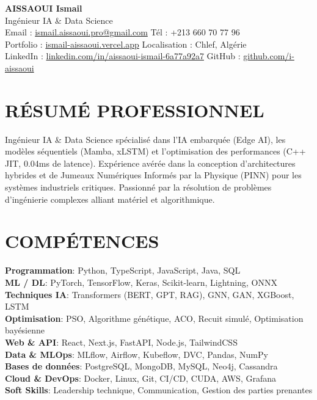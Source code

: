 \documentclass[a4paper,12pt]{article}
\begin{document}
\begin{center}
    {\Huge\bfseries\color{titleblue} AISSAOUI Ismail}\\[4pt]
    {\Large Ingénieur IA \& Data Science}\\[6pt]

    {\normalsize
    Email : \href{mailto:ismail.aissaoui.pro@gmail.com}{ismail.aissaoui.pro@gmail.com} \quad
    Tél : +213 660 70 77 96 \\
    Portfolio : \href{https://ismail-aissaoui.vercel.app}{ismail-aissaoui.vercel.app} \quad
    Localisation : Chlef, Algérie \\
    LinkedIn : \href{https://linkedin.com/in/aissaoui-ismail-6a77a92a7}{linkedin.com/in/aissaoui-ismail-6a77a92a7} \quad
    GitHub : \href{https://github.com/i-aissaoui}{github.com/i-aissaoui}
    }
\end{center}

\section{RÉSUMÉ PROFESSIONNEL}
Ingénieur IA \& Data Science spécialisé dans l'IA embarquée (Edge AI), les modèles séquentiels (Mamba, xLSTM) et l'optimisation des performances (C++ JIT, 0.04ms de latence). Expérience avérée dans la conception d'architectures hybrides et de Jumeaux Numériques Informés par la Physique (PINN) pour les systèmes industriels critiques. Passionné par la résolution de problèmes d'ingénierie complexes alliant matériel et algorithmique.

\section{COMPÉTENCES}
\setlength{\parskip}{-1pt}
{\normalsize
\textbf{Programmation}: Python, TypeScript, JavaScript, Java, SQL \\
\textbf{ML / DL}: PyTorch, TensorFlow, Keras, Scikit-learn, Lightning, ONNX \\
\textbf{Techniques IA}: Transformers (BERT, GPT, RAG), GNN, GAN, XGBoost, LSTM \\
\textbf{Optimisation}: PSO, Algorithme génétique, ACO, Recuit simulé, Optimisation bayésienne \\
\textbf{Web \& API}: React, Next.js, FastAPI, Node.js, TailwindCSS \\
\textbf{Data \& MLOps}: MLflow, Airflow, Kubeflow, DVC, Pandas, NumPy \\
\textbf{Bases de données}: PostgreSQL, MongoDB, MySQL, Neo4j, Cassandra \\
\textbf{Cloud \& DevOps}: Docker, Linux, Git, CI/CD, CUDA, AWS, Grafana \\
\textbf{Soft Skills}: Leadership technique, Communication, Gestion des parties prenantes
}
\end{document}
